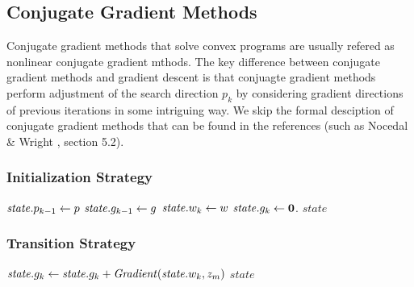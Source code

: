 \subsection{Conjugate Gradient Methods}
Conjugate gradient methods that solve convex programs are usually refered as nonlinear conjugate gradient mthods.
The key difference between conjugate gradient methods and gradient descent is that conjuagte gradient methods perform adjustment of the search direction $p_k$ by considering gradient directions of previous iterations in some intriguing way.
We skip the formal desciption of conjugate gradient methods that can be found in the references (such as Nocedal \& Wright \cite{nocedal2006numerical}, section 5.2). 

\subsubsection{Initialization Strategy}
\begin{algorithm}[initialization-cg$(w)$] \label{alg:initialization-cg}
\begin{algorithmic}[1]
    \State $\mathit{state}.p_{k-1} \leftarrow p$
    \State $\mathit{state}.g_{k-1} \leftarrow g$
    \State $\mathit{state}.w_k \leftarrow w$
    \State $\mathit{state}.g_k \leftarrow \boldsymbol{0}$.
    \State \Return $\mathit{state}$
\end{algorithmic}
\end{algorithm}

\subsubsection{Transition Strategy}
\begin{algorithm} \label{alg:transition-cg}
\begin{algorithmic}[1]
    \State $\mathit{state}.g_k \leftarrow \mathit{state}.g_k + \mathit{Gradient}(\mathit{state}.w_k, z_m)$
    \State \Return $\mathit{state}$
\end{algorithmic}
\end{algorithm}

